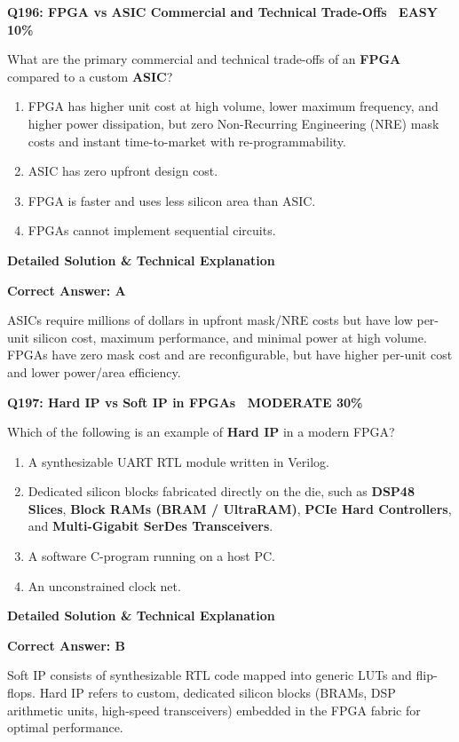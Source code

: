 \documentclass[11pt,a4paper]{article}
\newcommand{\badgemod}{{\color{white}\colorbox{modoran}{\bfseries\sffamily\tiny\ MODERATE 30\%\ }}}
\newcommand{\badgeeasy}{{\color{white}\colorbox{easygreen}{\bfseries\sffamily\tiny\ EASY 10\%\ }}}
\newenvironment{qbox}[2]{%
  \begin{mdframed}[style=qstyle]%
  {\bfseries\sffamily\color{primaryblue}#1 \hfill #2}\par\vspace{2pt}%
}{%
  \end{mdframed}%
}
\newenvironment{ansbox}{%
  \begin{mdframed}[style=ansstyle]%
  {\bfseries\sffamily\color{ansgreen}\small Detailed Solution \& Technical Explanation}\par\vspace{2pt}\small%
}{%
  \end{mdframed}%
}
\begin{document}
\begin{qbox}{Q196: FPGA vs ASIC Commercial and Technical Trade-Offs}{\badgeeasy}
What are the primary commercial and technical trade-offs of an \textbf{FPGA} compared to a custom \textbf{ASIC}?
\begin{enumerate}[label=\textbf{\Alph*.}]
  \item FPGA has higher unit cost at high volume, lower maximum frequency, and higher power dissipation, but zero Non-Recurring Engineering (NRE) mask costs and instant time-to-market with re-programmability.
  \item ASIC has zero upfront design cost.
  \item FPGA is faster and uses less silicon area than ASIC.
  \item FPGAs cannot implement sequential circuits.
\end{enumerate}
\end{qbox}
\begin{ansbox}
\textbf{Correct Answer: A}

ASICs require millions of dollars in upfront mask/NRE costs but have low per-unit silicon cost, maximum performance, and minimal power at high volume. FPGAs have zero mask cost and are reconfigurable, but have higher per-unit cost and lower power/area efficiency.
\end{ansbox}

\begin{qbox}{Q197: Hard IP vs Soft IP in FPGAs}{\badgemod}
Which of the following is an example of \textbf{Hard IP} in a modern FPGA?
\begin{enumerate}[label=\textbf{\Alph*.}]
  \item A synthesizable UART RTL module written in Verilog.
  \item Dedicated silicon blocks fabricated directly on the die, such as \textbf{DSP48 Slices}, \textbf{Block RAMs (BRAM / UltraRAM)}, \textbf{PCIe Hard Controllers}, and \textbf{Multi-Gigabit SerDes Transceivers}.
  \item A software C-program running on a host PC.
  \item An unconstrained clock net.
\end{enumerate}
\end{qbox}
\begin{ansbox}
\textbf{Correct Answer: B}

Soft IP consists of synthesizable RTL code mapped into generic LUTs and flip-flops. Hard IP refers to custom, dedicated silicon blocks (BRAMs, DSP arithmetic units, high-speed transceivers) embedded in the FPGA fabric for optimal performance.
\end{ansbox}
\end{document}
